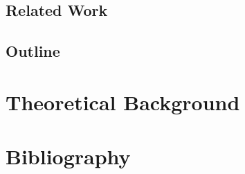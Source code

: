 \documentclass[12pt, letterpaper, twoside]{article}
\begin{document}
\subsection{Related Work}
\subsection{Outline}

\section{Theoretical Background}
\section{Bibliography}
\end{document}
